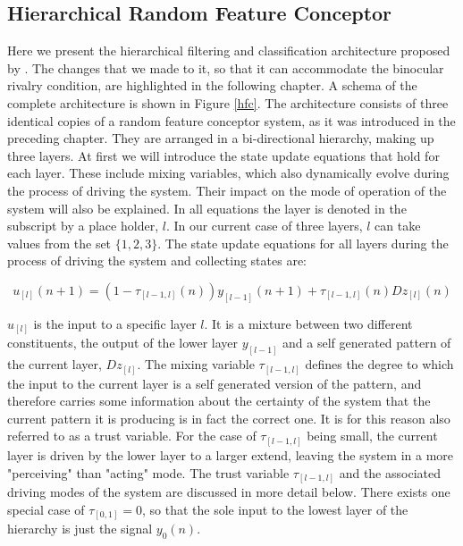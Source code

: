 \documentclass[utf8]{frontiersSCNS} %
\begin{document}
\subsection{Hierarchical Random Feature Conceptor}
    Here we present the hierarchical filtering and classification architecture proposed by \cite{Jaeger2014}. The changes that we made to it, so that it can accommodate the binocular rivalry condition, are highlighted in the following chapter. A schema of the complete architecture is shown in Figure \ref{hfc}. 
    The architecture consists of three identical copies of a random feature conceptor system, as it was introduced in the preceding chapter. They are arranged in a bi-directional hierarchy, making up three layers. At first we will  introduce the state update equations that hold for each layer. These include mixing variables, which also dynamically evolve during the process of driving the system. Their impact on the mode of operation of the system will also be explained. 
    In all equations the layer is denoted in the subscript by a place holder, $l$. In our current case of three layers, $l$ can take values from the set $\{1,2,3\}$. The state update equations for all layers during the process of driving the system and collecting states are:
    
    \begin{equation}
    u_{[l]} (n + 1)  =    (1 - \tau_{[l-1,l]} (n)) y_{[l-1]} (n + 1) + \tau_{[l-1,l]} (n) D z_{[l]} (n)
    \end{equation}
    
    $u_{[l]}$ is the input to a specific layer $l$. It is a mixture between two different constituents, the output of the lower layer $y_{[l-1]}$ and a self generated pattern of the current layer,  $D z_{[l]}$. The mixing variable $\tau_{[l-1,l]}$ defines the degree to which the input to the current layer is a self generated version of the pattern, and therefore carries some information about the certainty of the system that the current pattern it is producing is in fact the correct one. It is for this reason also referred to as a trust variable. For the case of $\tau_{[l-1,l]}$ being small, the current layer is driven by the lower layer to a larger extend, leaving the system in a more "perceiving" than "acting" mode. The trust variable $\tau_{[l-1,l]}$ and the associated driving modes of the system are discussed in more detail below. 
    There exists one special case of $\tau_{[0,1]} = 0$, so that the sole input to the lowest layer of the hierarchy is just the signal $y_{0}(n)$. 
    
\end{document}
